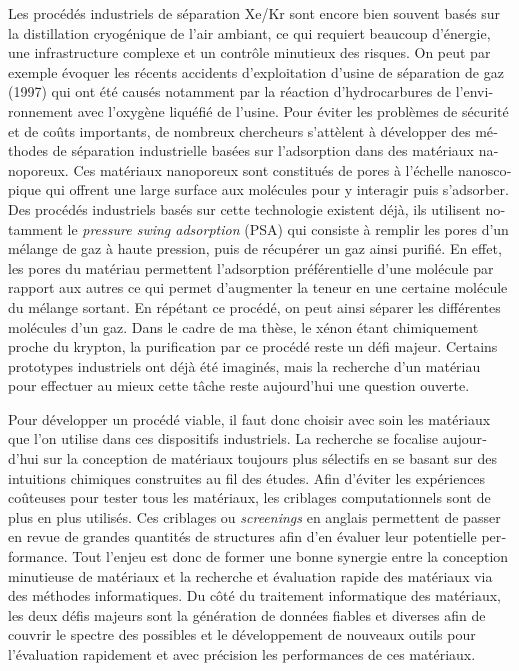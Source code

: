 \documentclass[thesis]{subfiles}
\begin{document}
\begin{otherlanguage}{french}
Les procédés industriels de séparation Xe/Kr sont encore bien souvent basés sur la distillation cryogénique de l'air ambiant, ce qui requiert beaucoup d'énergie, une infrastructure complexe et un contrôle minutieux des risques. On peut par exemple évoquer les récents accidents d'exploitation d'usine de séparation de gaz (1997) qui ont été causés notamment par la réaction d'hydrocarbures de l'environnement avec l'oxygène liquéfié de l'usine. Pour éviter les problèmes de sécurité et de coûts importants, de nombreux chercheurs s'attèlent à développer des méthodes de séparation industrielle basées sur l'adsorption dans des matériaux nanoporeux. Ces matériaux nanoporeux sont constitués de pores à l'échelle nanoscopique qui offrent une large surface aux molécules pour y interagir puis s'adsorber. Des procédés industriels basés sur cette technologie existent déjà, ils utilisent notamment le \emph{pressure swing adsorption} (PSA) qui consiste à remplir les pores d'un mélange de gaz à haute pression, puis de récupérer un gaz ainsi purifié. En effet, les pores du matériau permettent l'adsorption préférentielle d'une molécule par rapport aux autres ce qui permet d'augmenter la teneur en une certaine molécule du mélange sortant. En répétant ce procédé, on peut ainsi séparer les différentes molécules d'un gaz. Dans le cadre de ma thèse, le xénon étant chimiquement proche du krypton, la purification par ce procédé reste un défi majeur. Certains prototypes industriels ont déjà été imaginés, mais la recherche d'un matériau pour effectuer au mieux cette tâche reste aujourd'hui une question ouverte. 

Pour développer un procédé viable, il faut donc choisir avec soin les matériaux que l'on utilise dans ces dispositifs industriels. La recherche se focalise aujourd'hui sur la conception de matériaux toujours plus sélectifs en se basant sur des intuitions chimiques construites au fil des études. Afin d'éviter les expériences coûteuses pour tester tous les matériaux, les criblages computationnels sont de plus en plus utilisés. Ces criblages ou \emph{screenings} en anglais permettent de passer en revue de grandes quantités de structures afin d'en évaluer leur potentielle performance. Tout l'enjeu est donc de former une bonne synergie entre la conception minutieuse de matériaux et la recherche et évaluation rapide des matériaux via des méthodes informatiques. Du côté du traitement informatique des matériaux, les deux défis majeurs sont la génération de données fiables et diverses afin de couvrir le spectre des possibles et le développement de nouveaux outils pour l'évaluation rapidement et avec précision les performances de ces matériaux. 


\end{otherlanguage}
\end{document}
